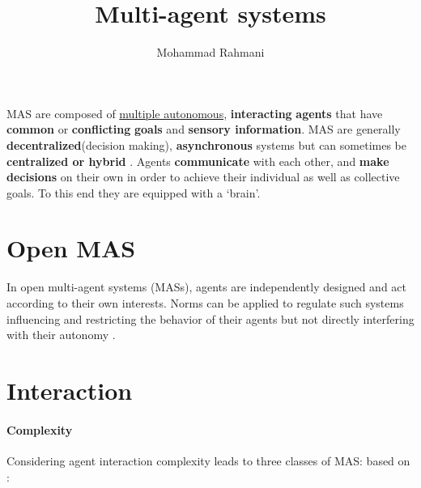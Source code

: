 \documentclass{article}
\begin{document}
	
	\title{Multi-agent systems}
	\author{Mohammad Rahmani}
	\date{}
	\maketitle
	MAS are composed of \underline{multiple autonomous}, \textbf{interacting} \textbf{agents} that have \textbf{common} or \textbf{conflicting} \textbf{goals} and \textbf{sensory information}. MAS are generally \textbf{decentralized}(decision making), \textbf{asynchronous} systems but can sometimes be \textbf{centralized or hybrid} \citep{shoham-2009-multiagent-systems-algorithmic-game-theoretic-and-logical-foundations}.
	Agents \textbf{communicate} with each other, and \textbf{make decisions} on their own in order to achieve their individual as well as collective goals. To this end they are equipped with a ‘brain’\citep{ciprich-2008-the-architecture-of-an-intelligent-agent-in-mas}.
	\section{Open MAS}
		In open multi-agent systems (MASs), agents are independently designed and act according to their own interests. Norms can be applied to regulate such systems influencing and restricting the behavior of their agents but not directly interfering with their autonomy \citep{santos-2018-detection-and-resolution-of-normative-conflicts-in-multi-agent-systems-a-literature-survey}.
	
	\section{Interaction}
		\paragraph{Complexity}
			Considering agent interaction complexity leads to three classes of MAS: 
			\cite{ngobye-2010-types-and-priorities-of-multi-agent-system-interactions}
			based on :
\end{document}
